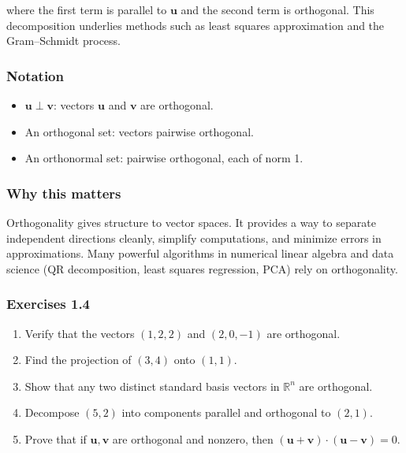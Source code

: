 \documentclass[
  12pt,
  a4paper,
]{article}
\begin{document}
where the first term is parallel to \(\mathbf{u}\) and the second term
is orthogonal. This decomposition underlies methods such as least
squares approximation and the Gram--Schmidt process.

\subsubsection{Notation}\label{notation-4}

\begin{itemize}
\item
  \(\mathbf{u} \perp \mathbf{v}\): vectors \(\mathbf{u}\) and
  \(\mathbf{v}\) are orthogonal.
\item
  An orthogonal set: vectors pairwise orthogonal.
\item
  An orthonormal set: pairwise orthogonal, each of norm 1.
\end{itemize}

\subsubsection{Why this matters}\label{why-this-matters-3}

Orthogonality gives structure to vector spaces. It provides a way to
separate independent directions cleanly, simplify computations, and
minimize errors in approximations. Many powerful algorithms in numerical
linear algebra and data science (QR decomposition, least squares
regression, PCA) rely on orthogonality.

\subsubsection{Exercises 1.4}\label{exercises-14}

\begin{enumerate}
\def\labelenumi{\arabic{enumi}.}
\item
  Verify that the vectors \((1,2,2)\) and \((2,0,-1)\) are orthogonal.
\item
  Find the projection of \((3,4)\) onto \((1,1)\).
\item
  Show that any two distinct standard basis vectors in \(\mathbb{R}^n\)
  are orthogonal.
\item
  Decompose \((5,2)\) into components parallel and orthogonal to
  \((2,1)\).
\item
  Prove that if \(\mathbf{u}, \mathbf{v}\) are orthogonal and nonzero,
  then \((\mathbf{u}+\mathbf{v})\cdot(\mathbf{u}-\mathbf{v}) = 0\).
\end{enumerate}
\end{document}
